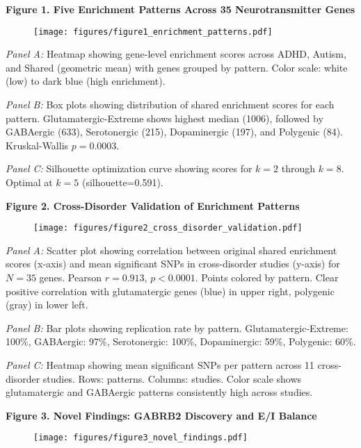 \documentclass[12pt,letterpaper]{article}
\theoremstyle{definition}
\theoremstyle{remark}
\begin{document}
\textbf{Figure 1. Five Enrichment Patterns Across 35 Neurotransmitter Genes}

\begin{figure}[H]
\centering
\texttt{[image: figures/figure1\_enrichment\_patterns.pdf]}
\end{figure}

\textit{Panel A:} Heatmap showing gene-level enrichment scores across ADHD, Autism, and Shared (geometric mean) with genes grouped by pattern. Color scale: white (low) to dark blue (high enrichment).

\textit{Panel B:} Box plots showing distribution of shared enrichment scores for each pattern. Glutamatergic-Extreme shows highest median (1006), followed by GABAergic (633), Serotonergic (215), Dopaminergic (197), and Polygenic (84). Kruskal-Wallis $p=0.0003$.

\textit{Panel C:} Silhouette optimization curve showing scores for $k=2$ through $k=8$. Optimal at $k=5$ (silhouette=0.591).

\vspace{1em}

\textbf{Figure 2. Cross-Disorder Validation of Enrichment Patterns}

\begin{figure}[H]
\centering
\texttt{[image: figures/figure2\_cross\_disorder\_validation.pdf]}
\end{figure}

\textit{Panel A:} Scatter plot showing correlation between original shared enrichment scores (x-axis) and mean significant SNPs in cross-disorder studies (y-axis) for $N=35$ genes. Pearson $r=0.913$, $p<0.0001$. Points colored by pattern. Clear positive correlation with glutamatergic genes (blue) in upper right, polygenic (gray) in lower left.

\textit{Panel B:} Bar plots showing replication rate by pattern. Glutamatergic-Extreme: 100\%, GABAergic: 97\%, Serotonergic: 100\%, Dopaminergic: 59\%, Polygenic: 60\%.

\textit{Panel C:} Heatmap showing mean significant SNPs per pattern across 11 cross-disorder studies. Rows: patterns. Columns: studies. Color scale shows glutamatergic and GABAergic patterns consistently high across studies.

\vspace{1em}

\textbf{Figure 3. Novel Findings: GABRB2 Discovery and E/I Balance}

\begin{figure}[H]
\centering
\texttt{[image: figures/figure3\_novel\_findings.pdf]}
\end{figure}
\end{document}
